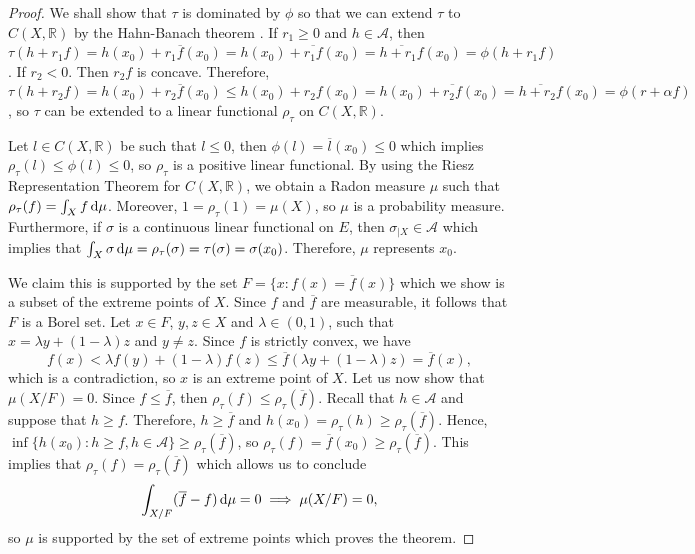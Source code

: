 \documentclass[12pt,a4paper]{amsart}
\theoremstyle{definition}
\begin{document}
\begin{proof}
		\par 
		We shall show that $\tau$ is dominated by $\phi$ so that we can extend $\tau$ to $C(X, \mathbb{R})$ by the Hahn-Banach theorem . If $r_1 \geq 0$ and $h \in \mathcal{A}$, then $\tau(h + r_1 f) = h(x_0) + r_1 \overline{f}(x_0) = h(x_0) + \overline{r_1 f}(x_0)  = \overline{h + r_1 f}(x_0) = \phi(h + r_1 f)$. If $ r_2 < 0$. Then $r_2 f$ is concave. Therefore, $\tau(h + r_2 f) = h(x_0) + r_2 \overline{f}(x_0) \leq h(x_0) + r_2 f(x_0) = h(x_0) + \overline{r_2 f}(x_0) = \overline{h + r_2 f}(x_0) = \phi(r + \alpha f)$, so $\tau$ can be extended to a linear functional $\rho_{\tau}$ on $C(X, \mathbb{R})$. 
		\par 
		Let $l \in C(X, \mathbb{R})$ be such that $l \leq 0$, then $\phi(l)  = \overline{l}(x_0) \leq 0$ which implies $ \rho_{\tau}(l) \leq \phi(l) \leq 0$, so $\rho_{\tau}$ is a positive linear functional. By using the Riesz Representation Theorem for $C(X, \mathbb{R})$, we obtain a Radon measure $\mu$ such that $\rho_{\tau}(f) = \int_{X} f \,  {\rm d} \mu $. Moreover, $1 = \rho_{\tau}(1) = \mu(X)$, so $\mu$ is a probability measure. Furthermore, if $\sigma$ is a continuous linear functional  on $E$, then $\sigma_{\vert X} \in \mathcal{A}$ which implies that $\int_{X} \sigma \,  {\rm d} \mu = \rho_{\tau}(\sigma) = \tau(\sigma) = \sigma(x_0)$. Therefore, $\mu$ represents $x_0$. 
		\par 
		We claim this is supported by the set $F = \lbrace x : f(x) = \overline{f}(x) \rbrace$ which we show is a subset of the extreme points of $X$. Since $f$ and $\overline{f}$ are measurable, it follows that $F$ is a Borel set. Let $x \in F$,  $y, z \in X$  and $\lambda \in (0, 1)$, such that $ x = \lambda y + (1 - \lambda) z$ and $y \neq z$. Since $f$ is strictly convex, we have
		\[ f(x)  < \lambda f(y) + (1- \lambda) f(z) \leq \overline{f}(\lambda y + (1 - \lambda) z ) = \overline{f}(x), \]
		which is a contradiction, so $x$ is an extreme point of $X$. Let us now show that $\mu(X/F) = 0$. Since $f \leq \overline{f}$, then $\rho_{\tau}(f) \leq \rho_{\tau}(\overline{f})$. Recall that $h \in \mathcal{A}$ and suppose that $h \geq f$. Therefore, $h \geq \overline{f}$ and $h(x_0) = \rho_{\tau}(h) \geq \rho_{\tau}(\overline{f})$. Hence, $\inf \lbrace h(x_0) : h \geq f, h \in \mathcal{A} \rbrace \geq \rho_{\tau}(\overline{f})$, so $ \rho_{\tau}(f) = \overline{f}(x_0) \geq \rho_{\tau}(\overline{f})$. This implies that $\rho_{\tau}(f) = \rho_{\tau}(\overline{f})$ which allows us to conclude
		\[  \int_{X/F} (\overline{f} - f) \, {\rm d} \mu  = 0 \implies \mu(X/F) = 0, \]
		so $\mu$ is supported by the set of extreme points which proves the theorem.
	\end{proof}
	
\end{document}
